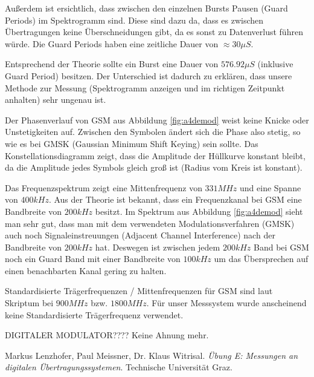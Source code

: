\documentclass[12pt,a4paper,ngerman]{article}
\begin{document}
Außerdem ist ersichtlich, dass zwischen den einzelnen Bursts Pausen (Guard Periods) im Spektrogramm sind. Diese sind dazu da, dass es zwischen Übertragungen keine Überschneidungen gibt, da es sonst zu Datenverlust führen würde. Die Guard Periods haben eine zeitliche Dauer von $\approx 30 \mu S$.

Entsprechend der Theorie sollte ein Burst eine Dauer von $576.92 \mu S$ (inklusive Guard Period) besitzen. Der Unterschied ist dadurch zu erklären, dass unsere Methode zur Messung (Spektrogramm anzeigen und im richtigen Zeitpunkt anhalten) sehr ungenau ist.

Der Phasenverlauf von GSM aus Abbildung \ref{fig:a4demod} weist keine Knicke oder Unstetigkeiten auf. Zwischen den Symbolen ändert sich die Phase also stetig, so wie es bei GMSK (Gaussian Minimum Shift Keying) sein sollte. Das Konstellationsdiagramm zeigt, dass die Amplitude der Hüllkurve konstant bleibt, da die Amplitude jedes Symbols gleich groß ist (Radius vom Kreis ist konstant).

Das Frequenzspektrum zeigt eine Mittenfrequenz von $331 MHz$ und eine Spanne von $400 kHz$. Aus der Theorie ist bekannt, dass ein Frequenzkanal bei GSM eine Bandbreite von $200 kHz$ besitzt. Im Spektrum aus Abbildung \ref{fig:a4demod} sieht man sehr gut, dass man mit dem verwendeten Modulationsverfahren (GMSK) auch noch Signaleinstreuungen (Adjacent Channel Interference) nach der Bandbreite von $200 kHz$ hat. Deswegen ist zwischen jedem $200 kHz$ Band bei GSM noch ein Guard Band mit einer Bandbreite von $100 kHz$ um das Übersprechen auf einen benachbarten Kanal gering zu halten.

Standardisierte Trägerfrequenzen / Mittenfrequenzen für GSM sind laut Skriptum bei $900 MHz$ bzw. $1800 MHz$. Für unser Messsystem wurde anscheinend keine Standardisierte Trägerfrequenz verwendet.

DIGITALER MODULATOR???? Keine Ahnung mehr.



\begin{thebibliography}{9}

  Markus Lenzhofer, Paul Meissner, Dr. Klaus Witrisal.
  \emph{Übung E: Messungen an digitalen Übertragungssystemen}.
  Technische Universität Graz.

\end{thebibliography}


 



   
\end{document}
